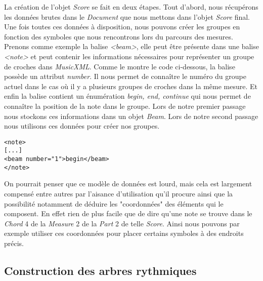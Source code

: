 \par
La création de l'objet \emph{Score} se fait en deux étapes. Tout d'abord, nous récupérons les données brutes dans le \emph{Document} que nous mettons dans l'objet \emph{Score} final. Une fois toutes ces données à disposition, nous pouvons créer les groupes en fonction des symboles que nous rencontrons lors du parcours des mesures. Prenons comme exemple la balise \emph{<beam>}, elle peut être présente dans une balise \emph{<note>} et peut contenir les informations nécessaires pour représenter un groupe de croches dans \emph{MusicXML}. Comme le montre le code ci-dessous, la balise possède un attribut \emph{number}. Il nous permet de connaître le numéro du groupe actuel dans le cas où il y a plusieurs groupes de croches dans la même mesure. Et enfin la balise contient un énumération \emph{begin, end, continue} qui nous permet de connaître la position de la note dans le groupe. Lors de notre premier passage nous stockons ces informations dans un objet \emph{Beam}. Lors de notre second passage nous utilisons ces données pour créer nos groupes.


\begin{lstlisting}[caption=Exemple d'une balise beam de MusicXML]
<note>
[...]
<beam number="1">begin</beam>
</note>
\end{lstlisting}


\par
On pourrait penser que ce modèle de données est lourd, mais cela est largement compensé entre autres par l'aisance d'utilisation qu'il procure ainsi que la possibilité notamment de déduire les "coordonnées" des éléments qui le composent. En effet rien de plus facile que de dire qu'une note se trouve dans le \emph{Chord} 4 de la \emph{Measure} 2 de la \emph{Part} 2 de telle \emph{Score}. Ainsi nous pouvons par exemple utiliser ces coordonnées pour placer certains symboles à des endroits précis.


\subsection{Construction des arbres rythmiques}

